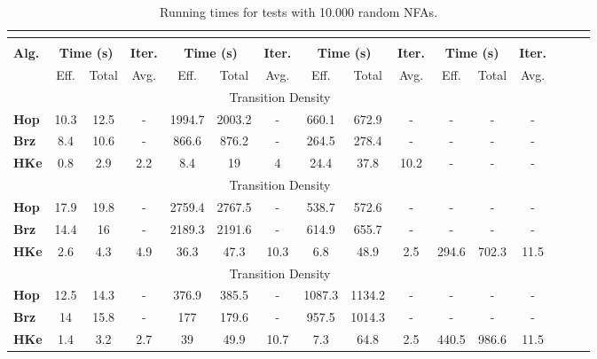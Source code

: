 \documentclass[copyright]{eptcs}
\newcommand{\nfas}{NFAs\xspace}
\begin{document}
\begin{table}[ht]
  \caption{Running times for tests with 10.000 random \nfas.}
  \label{tab:nfa}
  \centering
  \footnotesize
  \begin{tabular}[h]{|l|c|c|c|c|c|c|c|c|c|c|c|c|c|c|c|}
    \hline
    &\multicolumn{6}{|c|}{} & \multicolumn{6}{|c|}{} \\ 
    \hline
    &\multicolumn{3}{|c|}{} & \multicolumn{3}{|c|}{} &
    \multicolumn{3}{|c|}{} & \multicolumn{3}{|c|}{} \\
    \hline
    \bf Alg. &\multicolumn{2}{|c|}{\bf Time (s)} & {\bf Iter.} &
    \multicolumn{2}{|c|}{\bf Time (s)} & {\bf Iter.} &
    \multicolumn{2}{|c|}{\bf Time (s)} & {\bf Iter.} &
    \multicolumn{2}{|c|}{\bf Time (s)} & {\bf Iter.} \\
    \hline
    &Eff. & Total & Avg. & Eff. & Total & Avg. & Eff. & Total & Avg. & Eff. & Total & Avg. \\
    \hline
    \multicolumn{13}{|c|}{Transition Density } \\
    \hline
    \bf Hop &10.3	&12.5	&-	&1994.7	&2003.2	&-	&660.1	&672.9	&-	&-	&-	&-	\\
    \bf Brz &8.4	&10.6	&-	&866.6	&876.2	&-	&264.5	&278.4	&-	&-	&-	&-	\\
    \bf HKe &0.8	&2.9	&2.2	&8.4	&19	&4	&24.4	&37.8	&10.2	&-	&-	&-	\\
    \hline
    \multicolumn{13}{|c|}{Transition Density } \\
    \hline
    \bf Hop &17.9	&19.8	&-	&2759.4	&2767.5	&-	&538.7	&572.6	&-	&-	&-	&-	\\
    \bf Brz &14.4	&16	&-	&2189.3	&2191.6	&-	&614.9	&655.7	&-	&-	&-	&-	\\
    \bf HKe &2.6	&4.3	&4.9	&36.3	&47.3	&10.3	&6.8	&48.9	&2.5	&294.6	&702.3	&11.5	\\
    \hline
    \multicolumn{13}{|c|}{Transition Density } \\
    \hline
    \bf Hop &12.5	&14.3	&-	&376.9	&385.5	&-	&1087.3	&1134.2	&-	&-	&-	&-	\\
    \bf Brz &14	&15.8	&-	&177	&179.6	&-	&957.5	&1014.3	&-	&-	&-	&-	\\
    \bf HKe &1.4	&3.2	&2.7	&39	&49.9	&10.7	&7.3	&64.8	&2.5	&440.5	&986.6	&11.5	\\
    \hline
  \end{tabular}
\end{table}
 
\end{document}
